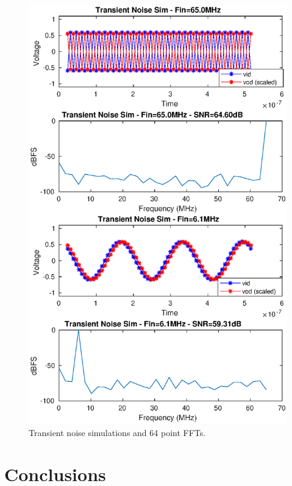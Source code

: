 \documentclass[10pt,journal]{IEEEtran}\usepackage{longtable}
\begin{document}
\begin{figure}[tbph]
\begin{center}
\includegraphics[width=1\columnwidth]{final_sim.eps}
\caption{Transient noise simulations and 64 point FFTs.}
\label{fig:TransientSims}
\end{center}
\end{figure}



\section{Conclusions}
\lipsum[5]






\end{document}

